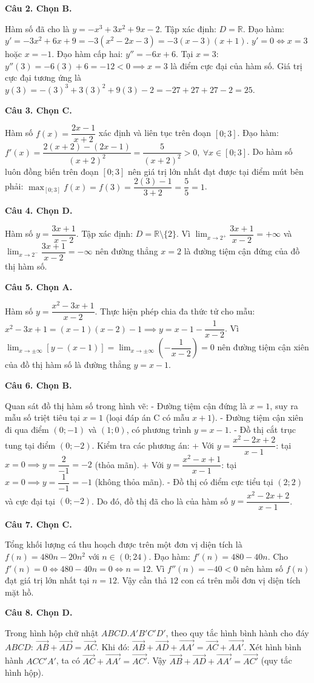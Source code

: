 \documentclass[12pt,a4paper]{article}
\newcommand{\loigiai}[1]{\par\medskip\Needspace{4\baselineskip}\noindent\textbf{#1}\par\nobreak}
\begin{document}
\loigiai{Câu 2. Chọn B.}
Hàm số đã cho là $y=-x^3+3x^2+9x-2$.
Tập xác định: $D=\mathbb{R}$.
Đạo hàm: $y'=-3x^2+6x+9=-3(x^2-2x-3)=-3(x-3)(x+1)$.
$y'=0 \iff x=3$ hoặc $x=-1$.
Đạo hàm cấp hai: $y''=-6x+6$.
Tại $x=3$: $y''(3)=-6(3)+6=-12<0 \implies x=3$ là điểm cực đại của hàm số.
Giá trị cực đại tương ứng là $y(3)=-(3)^3+3(3)^2+9(3)-2=-27+27+27-2=25$.

\loigiai{Câu 3. Chọn C.}
Hàm số $f(x)=\dfrac{2x-1}{x+2}$ xác định và liên tục trên đoạn $[0;3]$.
Đạo hàm: $f'(x)=\dfrac{2(x+2)-(2x-1)}{(x+2)^2}=\dfrac{5}{(x+2)^2}>0,\ \forall x\in[0;3]$.
Do hàm số luôn đồng biến trên đoạn $[0;3]$ nên giá trị lớn nhất đạt được tại điểm mút bên phải:
$\max_{[0;3]} f(x) = f(3) = \dfrac{2(3)-1}{3+2} = \dfrac{5}{5} = 1$.

\loigiai{Câu 4. Chọn D.}
Hàm số $y=\dfrac{3x+1}{x-2}$.
Tập xác định: $D=\mathbb{R}\setminus\{2\}$.
Vì $\lim_{x\to 2^+} \dfrac{3x+1}{x-2}=+\infty$ và $\lim_{x\to 2^-} \dfrac{3x+1}{x-2}=-\infty$ nên đường thẳng $x=2$ là đường tiệm cận đứng của đồ thị hàm số.

\loigiai{Câu 5. Chọn A.}
Hàm số $y=\dfrac{x^2-3x+1}{x-2}$.
Thực hiện phép chia đa thức tử cho mẫu:
$x^2-3x+1 = (x-1)(x-2) - 1 \implies y = x-1 - \dfrac{1}{x-2}$.
Vì $\lim_{x\to \pm\infty} [y - (x-1)] = \lim_{x\to \pm\infty} \left(-\dfrac{1}{x-2}\right) = 0$ nên đường tiệm cận xiên của đồ thị hàm số là đường thẳng $y=x-1$.

\loigiai{Câu 6. Chọn B.}
Quan sát đồ thị hàm số trong hình vẽ:
- Đường tiệm cận đứng là $x=1$, suy ra mẫu số triệt tiêu tại $x=1$ (loại đáp án C có mẫu $x+1$).
- Đường tiệm cận xiên đi qua điểm $(0;-1)$ và $(1;0)$, có phương trình $y=x-1$.
- Đồ thị cắt trục tung tại điểm $(0;-2)$. Kiểm tra các phương án:
  + Với $y=\dfrac{x^2-2x+2}{x-1}$: tại $x=0 \implies y=\dfrac{2}{-1}=-2$ (thỏa mãn).
  + Với $y=\dfrac{x^2-x+1}{x-1}$: tại $x=0 \implies y=\dfrac{1}{-1}=-1$ (không thỏa mãn).
- Đồ thị có điểm cực tiểu tại $(2;2)$ và cực đại tại $(0;-2)$.
Do đó, đồ thị đã cho là của hàm số $y=\dfrac{x^2-2x+2}{x-1}$.

\loigiai{Câu 7. Chọn C.}
Tổng khối lượng cá thu hoạch được trên một đơn vị diện tích là
$f(n)=480n-20n^2$ với $n\in(0;24)$.
Đạo hàm: $f'(n)=480-40n$.
Cho $f'(n)=0 \iff 480-40n=0 \iff n=12$.
Vì $f''(n)=-40<0$ nên hàm số $f(n)$ đạt giá trị lớn nhất tại $n=12$.
Vậy cần thả $12$ con cá trên mỗi đơn vị diện tích mặt hồ.

\loigiai{Câu 8. Chọn D.}
Trong hình hộp chữ nhật $ABCD.A'B'C'D'$, theo quy tắc hình bình hành cho đáy $ABCD$:
$\vec{AB}+\vec{AD}=\vec{AC}$.
Khi đó: $\vec{AB}+\vec{AD}+\vec{AA'} = \vec{AC}+\vec{AA'}$.
Xét hình bình hành $ACC'A'$, ta có $\vec{AC}+\vec{AA'}=\vec{AC'}$.
Vậy $\vec{AB}+\vec{AD}+\vec{AA'}=\vec{AC'}$ (quy tắc hình hộp).
\end{document}
